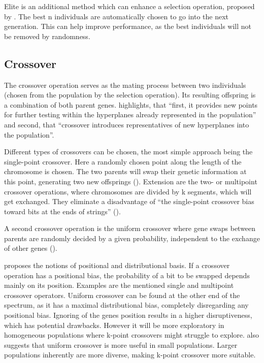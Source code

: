 Elite is an additional method which can enhance a selection operation, proposed by \cite{de_jong_analysis_1975}. The best n individuals are automatically chosen to go into the next generation. This can help improve performance, as the best individuals will not be removed by randomness.


\subsection{Crossover}
The crossover operation serves as the mating process between two individuals (chosen from the population by the selection operation). Its resulting offspring is a combination of both parent genes. \cite{grefenstette_optimization_1986} highlights, that \enquote{first, it provides new points for further testing within the hyperplanes already represented in the population} and second, that \enquote{crossover introduces representatives of new hyperplanes into the population}. 

Different types of crossovers can be chosen, the most simple approach being the single-point crossover. Here a randomly chosen point along the length of the chromosome is chosen. The two parents will swap their genetic information at this point, generating two new offsprings (\cite{katoch_review_2021}). Extension are the two- or multipoint crossover operations, where chromosomes are divided by k segments, which will get exchanged. They eliminate a disadvantage of \enquote{the single-point crossover bias toward bits at the ends of strings} (\cite{srinivas_genetic_1994}).

A second crossover operation is the uniform crossover where gene swaps between parents are randomly decided by a given probability, independent to the exchange of other genes (\cite{katoch_review_2021}). 

\cite{srinivas_genetic_1994} proposes the notions of positional and distributional basis. If a crossover operation has a positional bias, the probability of a bit to be swapped depends mainly on its position. Examples are the mentioned single and multipoint crossover operators. Uniform crossover can be found at the other end of the spectrum, as it has a maximal distributional bias, completely disregarding any positional bias. Ignoring of the genes position results in a higher disruptiveness, which has potential drawbacks. However it will be more exploratory in homogeneous populations where k-point crossovers might struggle to explore. \cite{srinivas_genetic_1994} also suggests that uniform crossover is more useful in small populations. Larger populations inherently are more diverse, making k-point crossover more suitable.


